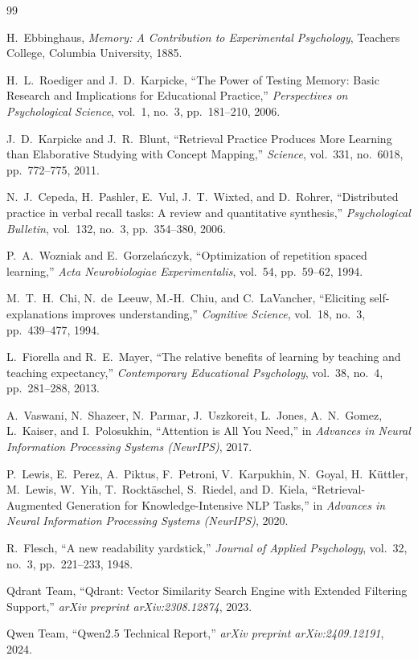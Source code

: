 \documentclass[12pt,a4paper,oneside]{report}
\begin{document}
\newpage
{}
\begin{thebibliography}{99}

H.~Ebbinghaus,
\emph{Memory: A Contribution to Experimental Psychology},
Teachers College, Columbia University, 1885.

H.~L.~Roediger and J.~D.~Karpicke,
``The Power of Testing Memory: Basic Research and Implications for Educational Practice,''
\emph{Perspectives on Psychological Science}, vol.~1, no.~3, pp.~181--210, 2006.

J.~D.~Karpicke and J.~R.~Blunt,
``Retrieval Practice Produces More Learning than Elaborative Studying with Concept Mapping,''
\emph{Science}, vol.~331, no.~6018, pp.~772--775, 2011.

N.~J.~Cepeda, H.~Pashler, E.~Vul, J.~T.~Wixted, and D.~Rohrer,
``Distributed practice in verbal recall tasks: A review and quantitative synthesis,''
\emph{Psychological Bulletin}, vol.~132, no.~3, pp.~354--380, 2006.

P.~A.~Wozniak and E.~Gorzela{\'n}czyk,
``Optimization of repetition spaced learning,''
\emph{Acta Neurobiologiae Experimentalis}, vol.~54, pp.~59--62, 1994.

M.~T.~H.~Chi, N.~de~Leeuw, M.-H.~Chiu, and C.~LaVancher,
``Eliciting self-explanations improves understanding,''
\emph{Cognitive Science}, vol.~18, no.~3, pp.~439--477, 1994.

L.~Fiorella and R.~E.~Mayer,
``The relative benefits of learning by teaching and teaching expectancy,''
\emph{Contemporary Educational Psychology}, vol.~38, no.~4, pp.~281--288, 2013.

A.~Vaswani, N.~Shazeer, N.~Parmar, J.~Uszkoreit, L.~Jones, A.~N.~Gomez, L.~Kaiser, and I.~Polosukhin,
``Attention is All You Need,''
in \emph{Advances in Neural Information Processing Systems (NeurIPS)}, 2017.

P.~Lewis, E.~Perez, A.~Piktus, F.~Petroni, V.~Karpukhin, N.~Goyal, H.~K{\"u}ttler, M.~Lewis, W.~Yih, T.~Rockt{\"a}schel, S.~Riedel, and D.~Kiela,
``Retrieval-Augmented Generation for Knowledge-Intensive NLP Tasks,''
in \emph{Advances in Neural Information Processing Systems (NeurIPS)}, 2020.

R.~Flesch,
``A new readability yardstick,''
\emph{Journal of Applied Psychology}, vol.~32, no.~3, pp.~221--233, 1948.

Qdrant Team,
``Qdrant: Vector Similarity Search Engine with Extended Filtering Support,''
\emph{arXiv preprint arXiv:2308.12874}, 2023.

Qwen Team,
``Qwen2.5 Technical Report,''
\emph{arXiv preprint arXiv:2409.12191}, 2024.

\end{thebibliography}
\end{document}

